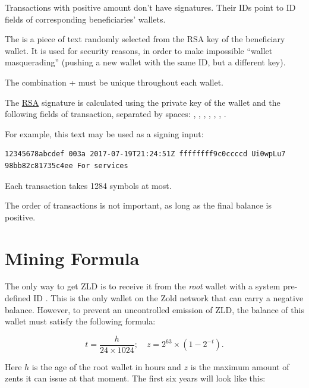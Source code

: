 \documentclass{main}
\begin{document}
Transactions with positive amount don't have signatures.
Their IDs point to ID fields of corresponding beneficiaries' wallets.

The  is a piece of text randomly selected from the RSA key
of the beneficiary wallet. It is used for security reasons, in order
to make impossible ``wallet masquerading'' (pushing a new wallet with the
same ID, but a different key).

The combination + must be unique throughout each wallet.

The \href{https://en.wikipedia.org/wiki/RSA_(cryptosystem)}{RSA}
signature is calculated using the private key of the
wallet and the following fields of transaction, separated by spaces:
, , , , , , .

For example, this text may be used as a signing input:

\begin{verbatim}
12345678abcdef 003a 2017-07-19T21:24:51Z ffffffff9c0ccccd Ui0wpLu7 98bb82c81735c4ee For services
\end{verbatim}

Each transaction takes 1284 symbols at most.

The order of transactions is not important, as long as the final balance is positive.

\section{Mining Formula}\label{sec:formula}

The only way to get ZLD is to receive it from the \emph{root} wallet
with a system pre-defined ID .
This is the only wallet on the Zold network that can carry a negative balance.
However, to prevent an uncontrolled emission of ZLD, the balance
of this wallet must satisfy the following formula:

\begin{equation}
t = \frac{h}{24 \times 1024}; \quad z = 2^{63} \times (1 - 2^{-t}).
\end{equation}

Here $h$ is the age of the root wallet in hours and $z$ is the maximum
amount of zents it can issue at that moment. The first
six years will look like this:
\end{document}
